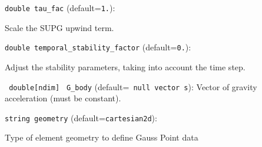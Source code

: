 \item\verb+double tau_fac+ {\rm(default=\verb|1.|)}:

Scale the SUPG upwind term. 

\item\verb+double temporal_stability_factor+ {\rm(default=\verb|0.|)}:

Adjust the stability parameters, taking into account
the time step. 

\item\verb+ double[ndim]+ \verb+ G_body+ {\rm(default=\verb| null vector s|)}:
 Vector of gravity acceleration (must be constant). %
\item\verb+string geometry+ {\rm(default=\verb|cartesian2d|)}:

Type of element geometry to define Gauss Point data

